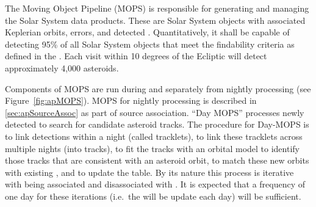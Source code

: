 The Moving Object Pipeline (MOPS) is responsible for generating and managing the Solar System data products. These are Solar System objects with associated Keplerian orbits, errors, and detected \DIASources. Quantitatively, it shall be capable of detecting 95\% of all Solar System objects that meet the findability criteria as defined in the \OSS\@. Each visit within 10 degrees of the Ecliptic will detect approximately 4,000 asteroids.

Components of MOPS are run during and separately from nightly processing (see Figure~\ref{fig:apMOPS}). MOPS for nightly processing is described in \ref{sec:apSourceAssoc} as part of source association. ``Day MOPS'' processes newly detected \DIAObjects to search for candidate asteroid tracks. The procedure for Day-MOPS is to link \DIASource detections within a night (called tracklets), to link these tracklets across multiple nights (into tracks), to fit the tracks with an orbital model to identify those tracks that are consistent with an asteroid orbit, to match these new orbits with existing \SSObjects, and to update the \SSObject table. By its nature this process is iterative with \DIASources being associated and disassociated with \SSObjects. It is expected that a frequency of one day for these iterations (i.e.\ the \SSObjects will be update each day) will be sufficient. 

